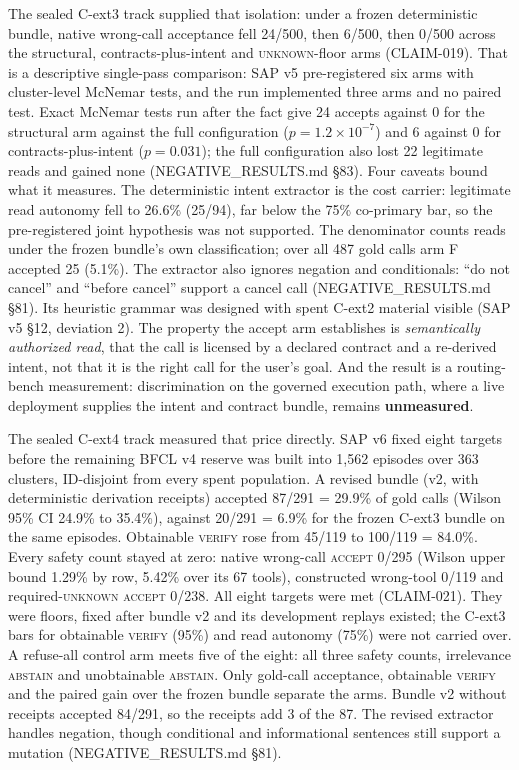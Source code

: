 \documentclass[10pt,twocolumn]{article}
\begin{document}
The sealed C-ext3 track supplied that isolation: under a frozen
deterministic bundle, native wrong-call acceptance fell 24/500, then 6/500,
then 0/500 across the structural, contracts-plus-intent and
\textsc{unknown}-floor arms (CLAIM-019). That is a descriptive
single-pass comparison: SAP v5 pre-registered six arms with cluster-level
McNemar tests, and the run implemented three arms and no paired test.
Exact McNemar tests run after the fact give 24 accepts against 0 for the
structural arm against the full configuration ($p = 1.2\times10^{-7}$) and 6
against 0 for contracts-plus-intent ($p = 0.031$); the full configuration
also lost 22 legitimate reads and gained none (NEGATIVE\_RESULTS.md \S83).
Four caveats bound what it measures. The deterministic intent extractor is the
cost carrier: legitimate read autonomy fell to 26.6\% (25/94), far below
the 75\% co-primary bar, so the pre-registered joint hypothesis was not
supported. The denominator counts reads under the frozen bundle's own
classification; over all 487 gold calls arm F accepted 25 (5.1\%). The extractor also ignores negation and conditionals: ``do not cancel'' and ``before cancel''
support a cancel call (NEGATIVE\_RESULTS.md \S81). Its heuristic grammar
was designed with spent C-ext2 material visible (SAP v5 \S12, deviation 2). The property
the accept arm establishes is \emph{semantically authorized read}, that the
call is licensed by a declared contract and a re-derived intent, not that it
is the right call for the user's goal. And the result is a routing-bench
measurement: discrimination on the governed execution path, where a live
deployment supplies the intent and contract bundle, remains
\textbf{unmeasured}.

The sealed C-ext4 track measured that price directly. SAP v6 fixed eight
targets before the remaining BFCL v4 reserve was built into 1{,}562 episodes
over 363 clusters, ID-disjoint from every spent population. A revised bundle
(v2, with deterministic derivation receipts) accepted 87/291 = 29.9\% of gold
calls (Wilson 95\% CI 24.9\% to 35.4\%), against 20/291 = 6.9\% for the frozen
C-ext3 bundle on the same episodes. Obtainable \textsc{verify} rose from
45/119 to 100/119 = 84.0\%. Every safety count stayed at zero: native
wrong-call \textsc{accept} 0/295 (Wilson upper bound 1.29\% by row, 5.42\%
over its 67 tools), constructed
wrong-tool 0/119 and required-\textsc{unknown} \textsc{accept} 0/238. All
eight targets were met (CLAIM-021). They were floors, fixed after bundle v2
and its development replays existed; the C-ext3 bars for obtainable
\textsc{verify} (95\%) and read autonomy (75\%) were not carried over. A
refuse-all control arm meets five of the eight: all three safety counts,
irrelevance \textsc{abstain} and unobtainable \textsc{abstain}. Only
gold-call acceptance, obtainable \textsc{verify} and the paired gain over
the frozen bundle separate the arms. Bundle v2 without receipts accepted
84/291, so the receipts add 3 of the 87. The revised extractor handles
negation, though conditional and informational sentences still support a
mutation (NEGATIVE\_RESULTS.md \S81).
\end{document}

